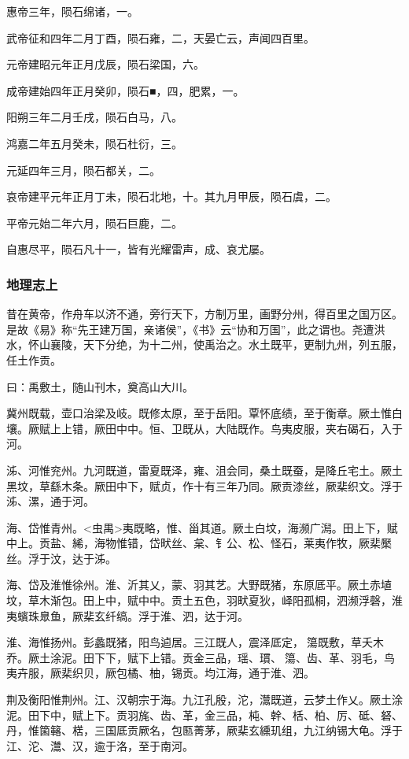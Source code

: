 \documentclass[]{article}
\begin{document}
惠帝三年，陨石绵诸，一。

武帝征和四年二月丁酉，陨石雍，二，天晏亡云，声闻四百里。

元帝建昭元年正月戊辰，陨石梁国，六。

成帝建始四年正月癸卯，陨石■，四，肥累，一。

阳朔三年二月壬戌，陨石白马，八。

鸿嘉二年五月癸未，陨石杜衍，三。

元延四年三月，陨石都关，二。

哀帝建平元年正月丁未，陨石北地，十。其九月甲辰，陨石虞，二。

平帝元始二年六月，陨石巨鹿，二。

自惠尽平，陨石凡十一，皆有光耀雷声，成、哀尤屡。

\hypertarget{header-n2507}{%
\subsubsection{地理志上}\label{header-n2507}}

昔在黄帝，作舟车以济不通，旁行天下，方制万里，画野分州，得百里之国万区。是故《易》称``先王建万国，亲诸侯''，《书》云``协和万国''，此之谓也。尧遭洪水，怀山襄陵，天下分绝，为十二州，使禹治之。水土既平，更制九州，列五服，任土作贡。

曰：禹敷土，随山刊木，奠高山大川。

冀州既载，壶口治梁及岐。既修太原，至于岳阳。覃怀底绩，至于衡章。厥土惟白壤。厥赋上上错，厥田中中。恒、卫既从，大陆既作。鸟夷皮服，夹右碣石，入于河。

泲、河惟兖州。九河既道，雷夏既泽，雍、沮会同，桑土既蚕，是降丘宅土。厥土黑坟，草繇木条。厥田中下，赋贞，作十有三年乃同。厥贡漆丝，厥棐织文。浮于泲、漯，通于河。

海、岱惟青州。\textless{}虫禺\textgreater{}夷既略，惟、甾其道。厥土白坟，海濒广澙。田上下，赋中上。贡盐、絺，海物惟错，岱畎丝、枲、钅公、松、怪石，莱夷作牧，厥棐檿丝。浮于汶，达于泲。

海、岱及淮惟徐州。淮、沂其乂，蒙、羽其艺。大野既猪，东原厎平。厥土赤埴坟，草木渐包。田上中，赋中中。贡土五色，羽畎夏狄，峄阳孤桐，泗濒浮磬，淮夷蠙珠臮鱼，厥棐玄纤缟。浮于淮、泗，达于河。

淮、海惟扬州。彭蠡既猪，阳鸟逌居。三江既人，震泽厎定，簜既敷，草夭木乔。厥土涂泥。田下下，赋下上错。贡金三品，瑶、瑻、簜、齿、革、羽毛，鸟夷卉服，厥棐织贝，厥包橘、柚，锡贡。均江海，通于淮、泗。

荆及衡阳惟荆州。江、汉朝宗于海。九江孔殷，沱，灊既道，云梦土作乂。厥土涂泥。田下中，赋上下。贡羽旄、齿、革，金三品，杶、幹、栝、柏、厉、砥、砮、丹，惟箘簵、楛，三国厎贡厥名，包匦菁茅，厥棐玄纁玑组，九江纳锡大龟。浮于江、沱、灊、汉，逾于洛，至于南河。
\end{document}
